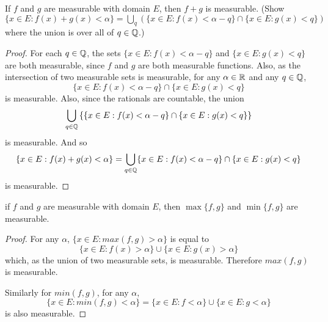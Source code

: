 \begin{pblm}%
	If $f$ and $g$ are measurable with domain $E$, then $f + g$ is measurable. 
	(Show $\{x \in E: f(x) + g(x) < \alpha\} = \bigcup\limits_{q} 
	(\{x \in E: f(x) < \alpha - q\} \cap \{x \in E: g(x) < q\})$ where the 
	union is over all of $q \in \mathbb{Q}$.)

\begin{proof}
	For each $q \in \mathbb{Q}$, the sets $\{x \in E: f(x) < \alpha - q\}$ and 
	$\{x \in E: g(x) < q\}$ are both measurable, since $f$ and $g$ are 
	both measurable functions. Also, as the intersection of two measurable 
	sets is measurable, for any $\alpha \in \mathbb{R}$ and any $q \in \mathbb{Q}$, 
	\begin{equation*}
		\{x \in E: f(x) < \alpha - q\} \cap \{x \in E: g(x) < q\}
	\end{equation*}
	is measurable.  Also, since the rationals are countable, the union 
	\begin{equation*}
		\bigcup\limits_{q \in \mathbb{Q}}\left\{\{x \in E: f(x) < \alpha - q\} \cap \{x \in E: g(x) < q\}\right\}
	\end{equation*}
	is measurable. 
	And so 
	\begin{equation*}
		\{x \in E: f(x) + g(x) < \alpha\} = 
		\bigcup\limits_{q \in \mathbb{Q}}\{x \in E: f(x) < \alpha - q\} 
		\cap \{x \in E: g(x) < q\} 
	\end{equation*}
	is measurable. 
\end{proof}
\end{pblm}

\begin{pblm}\label{p:minmaxmeasurable}%
	if $f$ and $g$ are measurable with domain $E$, then $\max\{f,g\}$ and 
	$\min\{f,g\}$ are measurable.
\begin{proof}
	For any $\alpha$, $\{x \in E: max(f, g) > \alpha\}$ is equal to 
	\begin{equation*}
		\{x \in E: f(x) > \alpha\} \cup \{x \in E: g(x) > \alpha\}
	\end{equation*}
	which, as the union of two measurable sets, is measurable. Therefore 
	$max(f, g)$ is measurable. 

	Similarly for $min(f, g)$, for any $\alpha$, 
	\begin{equation*}
		\{x \in E: min(f, g) < \alpha\} = \{x \in E: f < \alpha \} \cup \{x \in E: g < \alpha\}
	\end{equation*}
	is also measurable. 
\end{proof}
\end{pblm}

